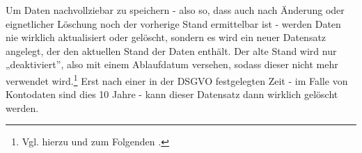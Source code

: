 
\bigbreak
\bigbreak

\noindent
Um Daten nachvollziebar zu speichern - also so, dass auch nach Änderung oder eignetlicher Löschung noch der vorherige Stand ermittelbar ist - werden Daten nie wirklich aktualisiert oder gelöscht, sondern es wird ein neuer Datensatz angelegt, der den aktuellen Stand der Daten enthält.
Der alte Stand wird nur „deaktiviert”, also mit einem Ablaufdatum versehen, sodass dieser nicht mehr verwendet wird.\footnote{Vgl. hierzu und zum Folgenden \pageref{i1:f2}.}
Erst nach einer in der DSGVO festgelegten Zeit - im Falle von Kontodaten sind dies 10 Jahre - kann dieser Datensatz dann wirklich gelöscht werden.

